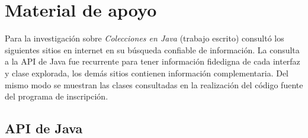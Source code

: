 \documentclass[a4paper,12pt]{article}
\begin{document}
\section{Material de apoyo}

Para la investigación sobre \textit{Colecciones en Java} (trabajo escrito) consultó los siguientes sitios en internet en su búsqueda confiable de información. La consulta a la API de Java fue recurrente para tener información fidedigna de cada interfaz y clase explorada, los demás sitios contienen información complementaria. Del mismo modo se muestran las clases consultadas en la realización del código fuente del programa de inscripción.

\subsection{API de Java}
\end{document}
